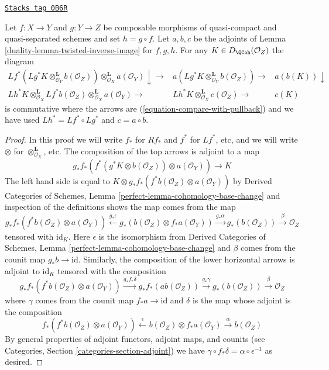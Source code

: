 \begin{lemma}
\label{duality-lemma-transitivity-compare-with-pullback}
\href{https://stacks.math.columbia.edu/tag/0B6R}{\texttt{Stacks tag 0B6R}}

Let $f : X \to Y$ and $g : Y \to Z$ be composable morphisms of quasi-compact
and quasi-separated schemes and set $h = g \circ f$. Let $a, b, c$ be the
adjoints of Lemma \ref{duality-lemma-twisted-inverse-image} for $f, g, h$.
For any $K \in D_\QCoh(\mathcal{O}_Z)$ the diagram
$$
\begin{array}{ccc}Lf^*(Lg^*K \otimes_{\mathcal{O}_Y}^\mathbf{L}
b(\mathcal{O}_Z)) \otimes_{\mathcal{O}_X}^\mathbf{L} a(\mathcal{O}_Y)
\downarrow\longrightarrow & a(Lg^*K \otimes_{\mathcal{O}_Y}^\mathbf{L} b(\mathcal{O}_Z)) \longrightarrow & a(b(K)) \downarrow \\ Lh^*K \otimes_{\mathcal{O}_X}^\mathbf{L} Lf^*b(\mathcal{O}_Z)
\otimes_{\mathcal{O}_X}^\mathbf{L} a(\mathcal{O}_Y) \longrightarrow & Lh^*K \otimes_{\mathcal{O}_X}^\mathbf{L} c(\mathcal{O}_Z) \longrightarrow & c(K)\end{array}
$$
is commutative where the arrows are (\ref{equation-compare-with-pullback})
and we have used $Lh^* = Lf^* \circ Lg^*$ and $c = a \circ b$.
\end{lemma}

\begin{proof}
In this proof we will write $f_*$ for $Rf_*$ and $f^*$ for $Lf^*$, etc,
and we will write $\otimes$ for $\otimes^\mathbf{L}_{\mathcal{O}_X}$, etc.
The composition of the top arrows is adjoint to a map
$$
g_*f_*(f^*(g^*K \otimes b(\mathcal{O}_Z)) \otimes a(\mathcal{O}_Y)) \to K
$$
The left hand side is equal to
$K \otimes g_*f_*(f^*b(\mathcal{O}_Z) \otimes a(\mathcal{O}_Y))$ by
Derived Categories of Schemes, Lemma
\ref{perfect-lemma-cohomology-base-change}
and inspection of the definitions shows the map comes from the map
$$
g_*f_*(f^*b(\mathcal{O}_Z) \otimes a(\mathcal{O}_Y))
\xleftarrow{g_*\epsilon}
g_*(b(\mathcal{O}_Z) \otimes f_*a(\mathcal{O}_Y)) \xrightarrow{g_*\alpha}
g_*(b(\mathcal{O}_Z)) \xrightarrow{\beta} \mathcal{O}_Z
$$
tensored with $\text{id}_K$. Here $\epsilon$ is the isomorphism from
Derived Categories of Schemes, Lemma
\ref{perfect-lemma-cohomology-base-change} and
$\beta$ comes from the counit map
$g_*b \to \text{id}$. Similarly, the composition of the lower
horizontal arrows is adjoint to $\text{id}_K$ tensored with the composition
$$
g_*f_*(f^*b(\mathcal{O}_Z) \otimes a(\mathcal{O}_Y)) \xrightarrow{g_*f_*\delta}
g_*f_*(ab(\mathcal{O}_Z)) \xrightarrow{g_*\gamma}
g_*(b(\mathcal{O}_Z)) \xrightarrow{\beta}
\mathcal{O}_Z
$$
where $\gamma$ comes from the counit map $f_*a \to \text{id}$
and $\delta$ is the map whose adjoint is the composition
$$
f_*(f^*b(\mathcal{O}_Z) \otimes a(\mathcal{O}_Y))
\xleftarrow{\epsilon}
b(\mathcal{O}_Z) \otimes f_*a(\mathcal{O}_Y) \xrightarrow{\alpha}
b(\mathcal{O}_Z)
$$
By general properties of adjoint functors, adjoint maps, and counits
(see Categories, Section \ref{categories-section-adjoint})
we have $\gamma \circ f_*\delta = \alpha \circ \epsilon^{-1}$ as desired.
\end{proof}

